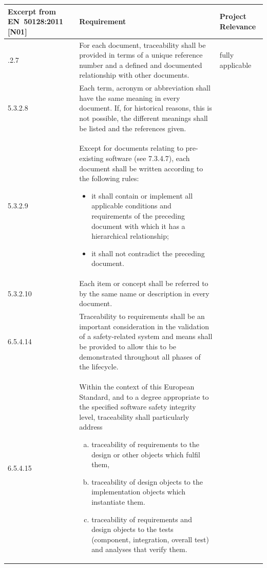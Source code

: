 \documentclass{template/openetcs_report}
\begin{document}
{\footnotesize\sffamily\centering
  \begin{longtable}{||p{}|p{}|p{}||}
    \hline\hline
    \bfseries Excerpt from EN~50128:2011 [N01] & \bfseries
    Requirement & \bfseries Project Relevance\\
    \hline\hline
    \endhead
    \hline\hline
    \endfoot
    5.3.2.7 & For each document, traceability shall be provided in
    terms of a unique reference number and a defined and documented
    relationship with other documents.  &
    fully applicable\\
    \hline 5.3.2.8 & Each term, acronym or abbreviation shall have the
    same meaning in every document.  If, for historical reasons, this
    is not possible, the different meanings shall be listed and the
    references given.  &
    \\
    \hline 5.3.2.9 & Except for documents relating to pre-existing
    software (see 7.3.4.7), each document shall be written according
    to the following rules:
    \begin{itemize}
    \item it shall contain or implement all applicable conditions and
      requirements of the preceding document with which it has a
      hierarchical relationship;
    \item it shall not contradict the preceding document.
    \end{itemize}
    &
    \\
    \hline 5.3.2.10 & Each item or concept shall be referred to by the
    same name or description in every document.  &
    \\
    \hline 6.5.4.14 & Traceability to requirements shall be an
    important consideration in the validation of a safety-related
    system and means shall be provided to allow this to be
    demonstrated throughout all phases of the lifecycle.  &
    \\
    \hline 6.5.4.15 & Within the context of this European Standard,
    and to a degree appropriate to the specified software safety
    integrity level, traceability shall particularly address
    \begin{enumerate}[a)]
    \item traceability of requirements to the design or other objects
      which fulfil them,
    \item traceability of design objects to the implementation objects
      which instantiate them.
    \item traceability of requirements and design objects to the tests
      (component, integration, overall test) and analyses that verify
      them.
    \end{enumerate}


\end{longtable}}
\end{document}
